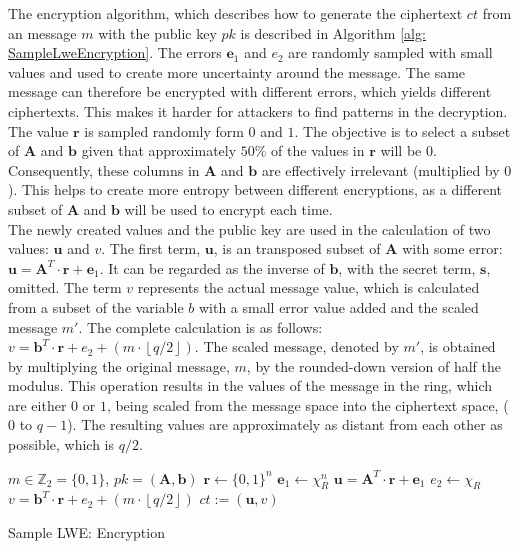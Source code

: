 The encryption algorithm, which describes how to generate the ciphertext $ct$ from an message $m$ with the public key $pk$ is described in Algorithm \ref{alg: SampleLweEncryption}. The errors $\textbf{e}_1$ and $e_2$ are randomly sampled with small values and used to create more uncertainty around the message. The same message can therefore be encrypted with different errors, which yields different ciphertexts. This makes it harder for attackers to find patterns in the decryption. The value $\textbf{r}$ is sampled randomly form $0$ and $1$. The objective is to select a subset of $\textbf{A}$ and $\textbf{b}$ given that approximately $50\%$ of the values in $\textbf{r}$ will be $0$. Consequently, these columns in $\textbf{A}$ and $\textbf{b}$ are effectively irrelevant (multiplied by $0$). This helps to create more entropy between different encryptions, as a different subset of $\textbf{A}$ and $\textbf{b}$ will be used to encrypt each time.\\
The newly created values and the public key are used in the calculation of two values: $\textbf{u}$ and $v$. The first term, $\textbf{u}$, is an transposed subset of $\textbf{A}$ with some error: $\textbf{u} = \textbf{A}^T \cdot \textbf{r} + \textbf{e}_1$. It can be regarded as the inverse of $\textbf{b}$, with the secret term, $\textbf{s}$, omitted. The term $v$ represents the actual message value, which is calculated from a subset of the variable $b$ with a small error value added and the scaled message $m'$. The complete calculation is as follows: $v = \textbf{b}^T \cdot \textbf{r} + e_2 + (m\cdot \left\lfloor q/2\right\rfloor)$. 
The scaled message, denoted by $m'$, is obtained by multiplying the original message, $m$, by the rounded-down version of half the modulus. This operation results in the values of the message in the ring, which are either $0$ or $1$, being scaled from the message space into the ciphertext space, ($0$ to $q-1$). The resulting values are approximately as distant from each other as possible, which is $q/2$.

\begin{algorithm}[htb]
  \begin{algorithmic}[1]
    \REQUIRE $m \in \mathbb{Z}_2 = \{0, 1\}$, $pk = (\textbf{A}, \textbf{b})$
    \STATE $\textbf{r} \leftarrow \{0, 1\}^n$
    \STATE $\textbf{e}_1 \leftarrow \chi_R^n$
    \STATE $\textbf{u} = \textbf{A}^T \cdot \textbf{r} + \textbf{e}_1$
    \STATE $e_2 \leftarrow \chi_R$
    \STATE $v = \textbf{b}^T \cdot \textbf{r} + e_2 + (m\cdot \left\lfloor q/2\right\rfloor)$
    \RETURN $ct := (\textbf{u}, v)$
  \end{algorithmic}
  \caption{Sample LWE: Encryption}
  \label{alg: SampleLweEncryption}
\end{algorithm}

